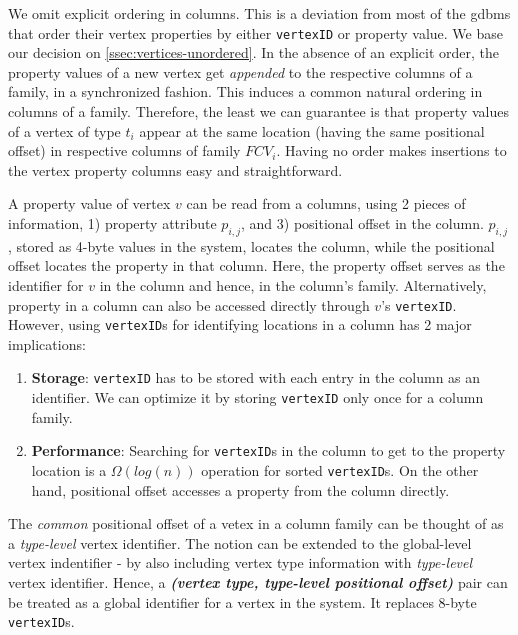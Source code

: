 We omit explicit ordering in columns. This is a deviation from most of the \gls{gdbms} that order their vertex properties by either \texttt{vertexID} or property value.  We base our decision on \ref{ssec:vertices-unordered}. In the absence of an explicit order, the property values of a new vertex get \emph{appended} to the respective columns of a family, in a synchronized fashion. This induces a common natural ordering in columns of a family. Therefore, the least we can guarantee is that property values of a vertex of type $t_i$ appear at the same location (having the same positional offset) in respective columns of family $FCV_i$. Having no order makes insertions to the vertex property columns easy and straightforward.

A property value of vertex $v$ can be read from a columns, using 2 pieces of information, 1) property attribute $p_{i,j}$, and 3) positional offset in the column. $p_{i,j}$, stored as 4-byte values in the system, locates the column, while the positional offset locates the property in that column. Here, the property offset serves as the identifier for $v$ in the column and hence, in the column's family. Alternatively, property in a column can also be accessed directly through $v$'s \texttt{vertexID}. However, using \texttt{vertexID}s for identifying locations in a column has 2 major implications:
\vspace{-6pt}
\begin{enumerate}
	\item \textbf{Storage}: \texttt{vertexID} has to be stored with each entry in the column as an identifier. We can optimize it by storing \texttt{vertexID} only once for a column family.
	\item \textbf{Performance}: Searching for \texttt{vertexID}s in the column to get to the property location is a $\Omega(log(n))$ operation for sorted \texttt{vertexID}s. On the other hand, positional offset accesses a property from the column directly.
\end{enumerate}
\vspace{-6pt}
The \emph{common} positional offset of a vetex in a column family can be thought of as a \emph{type-level} vertex identifier. The notion can be extended to the global-level vertex indentifier - by also including vertex type information with \emph{type-level} vertex identifier. Hence, a \emph{\textbf{(vertex type, type-level positional offset)}} pair can be treated as a global identifier for a vertex in the system. It replaces 8-byte \texttt{vertexID}s. 

